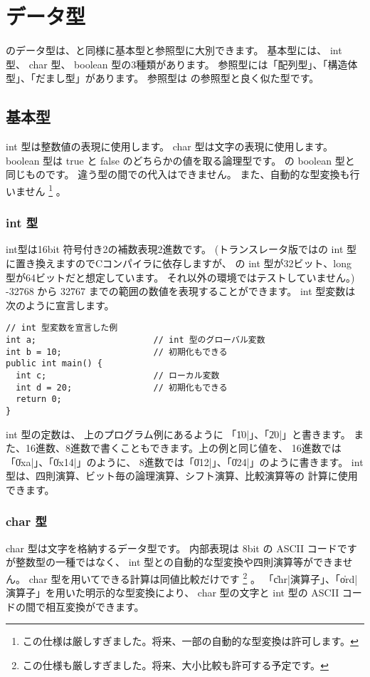 \section{データ型}

\cmml のデータ型は、\javal と同様に基本型と参照型に大別できます。
基本型には、 int 型、 char 型、 boolean 型の3種類があります。
参照型には「配列型」、「構造体型」、「だまし型」があります。
参照型は \javal の参照型と良く似た型です。

\subsection{基本型}

int 型は整数値の表現に使用します。
char 型は文字の表現に使用します。
boolean 型は true と false のどちらかの値を取る論理型です。
\javal の boolean 型と同じものです。
違う型の間での代入はできません。
また、自動的な型変換も行いません
\footnote{この仕様は厳しすぎました。将来、一部の自動的な型変換は許可します。}
。

\subsubsection{int 型}
int型は16bit 符号付き2の補数表現2進数です。
(トランスレータ版では\cl の int 型に置き換えますのでCコンパイラに依存しますが、
{\cl}の int 型が32ビット、long 型が64ビットだと想定しています。
それ以外の環境ではテストしていません。)
-32768 から 32767 までの範囲の数値を表現することができます。
int 型変数は次のように宣言します。

\begin{mylist}
\begin{verbatim}
// int 型変数を宣言した例
int a;                       // int 型のグローバル変数
int b = 10;                  // 初期化もできる
public int main() {
  int c;                     // ローカル変数
  int d = 20;                // 初期化もできる
  return 0;
}
\end{verbatim}
\end{mylist}

int 型の定数は、
上のプログラム例にあるように 「\|10|」、「\|20|」と書きます。
また、16進数、8進数で書くこともできます。上の例と同じ値を、
16進数では「\|0xa|」、「\|0x14|」のように、
8進数では「\|012|」、「\|024|」のように書きます。
int 型は、四則演算、ビット毎の論理演算、シフト演算、比較演算等の
計算に使用できます。

\subsubsection{char 型}
char 型は文字を格納するデータ型です。
内部表現は 8bit の ASCII コードですが整数型の一種ではなく、
int 型との自動的な型変換や四則演算等ができません。
char 型を用いてできる計算は同値比較だけです
\footnote{この仕様も厳しすぎました。将来、大小比較も許可する予定です。}
。
「\|chr|演算子」、「\|ord|演算子」を用いた明示的な型変換により、
char 型の文字と int 型の ASCII コードの間で相互変換ができます。

